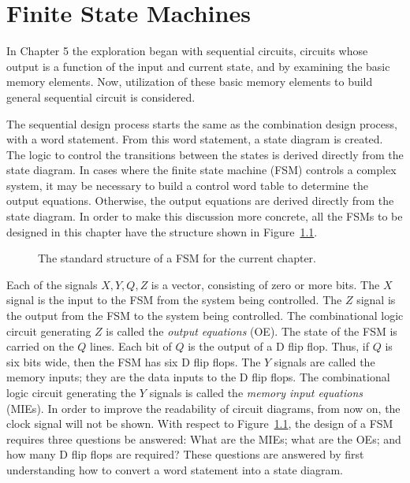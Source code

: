 \chapter{Finite State Machines}

In Chapter 5 the exploration began with sequential circuits, circuits
whose output is a function of the input and current state, and by examining
the basic memory elements. Now, utilization of these basic
memory elements to build general sequential circuit is considered.

The sequential design process starts the same as the combination design
process, with a word statement.  From this word statement, a state diagram is created. 
The logic to control the transitions between the
states is derived directly from
the state diagram.  In cases where the finite state machine (FSM) controls a 
complex system, it may be necessary to build a control word table to 
determine the output equations.  Otherwise, the output equations are derived
directly from the state diagram.  In order to make this discussion more 
concrete, all the FSMs to be designed in this chapter have the 
structure shown in Figure~\ref{fig:GenFSM}.

\begin{figure}[ht]
\caption{The standard structure of a FSM for the current chapter.}
\label{fig:GenFSM}
\end{figure}
\label{page:GenFSM}

Each of the signals $X,Y,Q,Z$ is a vector, consisting of zero or more bits.  
The $X$ signal is the input to the FSM from the system being controlled.  
The $Z$ signal is the output from the FSM to the system being controlled.
The combinational logic circuit generating $Z$ is called the {\it output 
equations} (OE).  The state of the FSM is carried on the $Q$ 
lines.  Each bit of $Q$ is the output of a D flip flop. Thus, if $Q$ is
six bits wide, then the FSM has six D flip flops.  The $Y$ signals are 
called the 
memory inputs; they are the data inputs to the D flip flops.  The combinational
logic circuit generating the $Y$ signals is called the {\it memory input
equations} (MIEs). In order to improve the readability of circuit 
diagrams, from now on, the clock signal will not be shown.
With respect to Figure~\ref{fig:GenFSM}, the design 
of a FSM requires three questions be answered: What are the MIEs; what 
are the OEs; and how many D flip flops are required?  These questions are  
answered by first understanding how to convert a word statement into a state
diagram.



